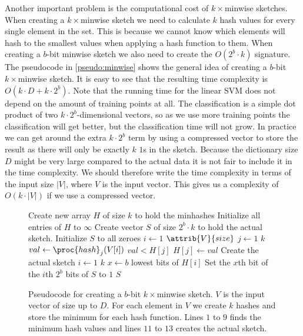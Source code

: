 Another important problem is the computational cost of $k\times$minwise
sketches. When creating a $k\times$minwise sketch we need to calculate $k$
hash values for every single element in the set. This is because we cannot
know which elements will hash to the smallest values when applying a hash
function to them. When creating a $b$-bit
minwise sketch we also need to create the $O(2^b\cdot k)$ signature.
The pseudocode in \autoref{pseudo:minwise} shows the general idea of creating
a $b$-bit $k\times$minwise sketch. It is easy to see that the resulting
time complexity is $O(k\cdot D + k\cdot 2^b)$. Note that the running time for
the linear SVM does not depend on the amount of training points at all. The
classification is a simple dot product of two $k\cdot2^b$-dimensional vectors,
so as we use more training points the classification will get better, but
the classification time will not grow. In practice we can get around
the extra $k\cdot 2^b$ term by using a compressed vector to store the result
as there will only be exactly $k$ $1$s in the sketch. Because the dictionary
size $D$ might be very large compared to the actual data it is not fair to
include it in the time complexity. We should therefore write the time
complexity in terms of the input size $|V|$, where $V$ is the input vector.
This gives us a complexity of $O(k\cdot |V|)$ if we use a compressed vector.

\begin{figure}[htbp]
\begin{codebox}
    \li Create new array $H$ of size $k$ to hold the minhashes
    \li Initialize all entries of $H$ to $\infty$
    \li Create vector $S$ of size $2^b\cdot k$ to hold the actual sketch.
    \li Initialize $S$ to all zeroes
    \li \For $i \gets 1$ \To $\attrib{V}{size}$
    \li \Do
            \For $j\gets 1$ \To $k$
    \li     \Do
                $val\gets \proc{hash}_j(V[i])$
    \li         \If $val < H[j]$
    \li         \Then
                    $H[j]\gets val$
                \End
            \End
        \End
    \li \Comment Create the actual sketch
    \li \For $i\gets 1$ \To $k$
    \li \Do
            $x \gets b$ lowest bits of $H[i]$
    \li     Set the $x$th bit of the $i$th $2^b$ bits of $S$ to $1$
        \End
    \li \Return $S$
\end{codebox}
\caption{Pseudocode for creating a $b$-bit $k\times$minwise sketch. $V$ is
         the input vector of size up to $D$. For each element in $V$ we create
         $k$ hashes and store the minimum for each hash function. Lines $1$
         to $9$ finds the minimum hash values and lines $11$ to $13$ creates
         the actual sketch.}
\label{pseudo:minwise}
\end{figure}



